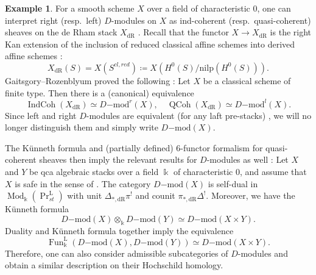 \documentclass[11pt]{amsart}
\numberwithin{equation}{section}
\theoremstyle{plain}
\theoremstyle{definition}
\newtheorem{eg}[Eg]{Example}
\theoremstyle{remark}
\newcommand{\Mod}{{\operatorname{Mod}}}
\newcommand\Fun{\operatorname{Fun}}
\newcommand\PrLst{  {  \operatorname{Pr}^{\operatorname{L} }_{st} } }
\newcommand\IndCoh{\operatorname{IndCoh}}
\newcommand\QCoh{\operatorname{QCoh}}
\begin{document}
\begin{eg}
For a smooth scheme $X$ over a field of characteristic $0$, one can interpret right (resp.~left) $D$-modules on $X$ as ind-coherent (resp.~quasi-coherent) sheaves on the de Rham stack $X_\mathrm{dR}$ \cite{Gaitsgory-Rozenblyum-crystal}. Recall that the functor $X \to X_\mathrm{dR}$ is the right Kan extension of the inclusion of reduced classical affine schemes into derived affine schemes \cite[Section 1.1]{Gaitsgory-Rozenblyum-crystal}:
\[X_\mathrm{dR}(S) = X(S^{cl,red}) \coloneqq X(H^0(S)/\mathrm{nilp}(H^0(S))).\]
Gaitsgory--Rozenblyum proved the following
\cite[Section 5.5]{Gaitsgory-Rozenblyum-crystal}:
Let $X$ be a classical scheme of finite type. Then there is a (canonical) equivalence
\[\IndCoh(X_\mathrm{dR}) \simeq D\mathrm{-mod}^r(X), \quad \QCoh(X_\mathrm{dR})\simeq D\mathrm{-mod}^l(X).\]
Since left and right $D$-modules are equivalent (for any laft pre-stacks) \cite[Proposition 2.2.4]{Gaitsgory-Rozenblyum-crystal}, we will no longer distinguish them and simply write $D\mathrm{-mod}(X)$.



The K\"unneth formula and (partially defined) 6-functor formalism for quasi-coherent sheaves then imply the relevant results for $D$-modules as well \cite{Gaitsgory-Rozenblyum-crystal} \cite[Corollary 8.3.4 \& 8.4.3]{Drinfeld-Gaitsgory}:
Let $X$ and $Y$ be qca algebraic stacks over a field $\Bbbk$ of characteristic $0$, and assume that $X$ is safe in the sense of \cite[Definition 10.2.2]{Drinfeld-Gaitsgory}. The category $D\mathrm{-mod}(X)$ is self-dual in $\Mod_\Bbbk(\PrLst)$ with unit $\Delta_{*,\mathrm{dR}}\pi^!$ and counit $\pi_{*,\mathrm{dR}}\Delta^!$. Moreover, we have the K\"unneth formula
\[D\mathrm{-mod}(X) \otimes_\Bbbk D\mathrm{-mod}(Y) \simeq D\mathrm{-mod}(X \times Y).\]
Duality and K\"unneth formula together imply the equivalence
\[\Fun_\Bbbk^\mathrm{L}(D\mathrm{-mod}(X), D\mathrm{-mod}(Y)) \simeq D\mathrm{-mod}(X \times Y).\]
Therefore, one can also consider admissible subcategories of $D$-modules and obtain a similar description on their Hochschild homology.
\end{eg}
\end{document}
